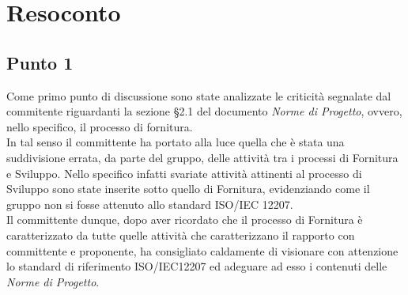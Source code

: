 \section{Resoconto}

\subsection{Punto 1}
Come primo punto di discussione sono state analizzate le criticità segnalate dal commitente riguardanti la sezione §2.1 del documento \textit{Norme di Progetto}, ovvero, nello specifico, il processo di fornitura.\\
In tal senso il committente ha portato alla luce quella che è stata una suddivisione errata, da parte del gruppo, delle attività tra i processi di Fornitura e Sviluppo. Nello specifico infatti svariate attività attinenti al processo di Sviluppo sono state inserite sotto quello di Fornitura, evidenziando come il gruppo non si fosse attenuto allo standard ISO/IEC 12207.\\
Il committente dunque, dopo aver ricordato che il processo di Fornitura è caratterizzato da tutte quelle attività che caratterizzano il rapporto con committente e proponente, ha consigliato caldamente di visionare con attenzione lo standard di riferimento ISO/IEC12207 ed adeguare ad esso i contenuti delle \textit{Norme di Progetto}.


